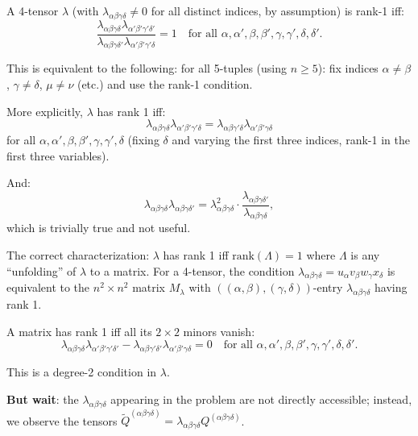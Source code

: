 \documentclass[12pt]{article}
\theoremstyle{definition}
\begin{document}
A 4-tensor $\lambda$ (with $\lambda_{\alpha\beta\gamma\delta}\neq 0$ for all distinct indices, by assumption) is rank-1 iff:
$$\frac{\lambda_{\alpha\beta\gamma\delta}\lambda_{\alpha'\beta'\gamma'\delta'}}{\lambda_{\alpha\beta\gamma\delta'}\lambda_{\alpha'\beta'\gamma'\delta}} = 1 \quad\text{for all }\alpha,\alpha',\beta,\beta',\gamma,\gamma',\delta,\delta'.$$

This is equivalent to the following: for all 5-tuples (using $n\geq 5$): fix indices $\alpha\neq\beta$, $\gamma\neq\delta$, $\mu\neq\nu$ (etc.) and use the rank-1 condition.

More explicitly, $\lambda$ has rank 1 iff:
\begin{equation}\label{eq:rank1-cond}
\lambda_{\alpha\beta\gamma\delta}\lambda_{\alpha'\beta'\gamma'\delta} = \lambda_{\alpha\beta\gamma'\delta}\lambda_{\alpha'\beta'\gamma\delta}
\end{equation}
for all $\alpha,\alpha',\beta,\beta',\gamma,\gamma',\delta$ (fixing $\delta$ and varying the first three indices, rank-1 in the first three variables).

And:
\begin{equation}\label{eq:rank1-cond2}
\lambda_{\alpha\beta\gamma\delta}\lambda_{\alpha\beta\gamma\delta'} = \lambda_{\alpha\beta\gamma\delta}^2 \cdot\frac{\lambda_{\alpha\beta\gamma\delta'}}{\lambda_{\alpha\beta\gamma\delta}},
\end{equation}
which is trivially true and not useful.

The correct characterization: $\lambda$ has rank 1 iff $\mathrm{rank}(\Lambda) = 1$ where $\Lambda$ is any ``unfolding'' of $\lambda$ to a matrix. For a 4-tensor, the condition $\lambda_{\alpha\beta\gamma\delta} = u_\alpha v_\beta w_\gamma x_\delta$ is equivalent to the $n^2\times n^2$ matrix $M_{\lambda}$ with $((\alpha,\beta),(\gamma,\delta))$-entry $\lambda_{\alpha\beta\gamma\delta}$ having rank 1.

A matrix has rank 1 iff all its $2\times 2$ minors vanish:
\begin{equation}\label{eq:rank1-matrix}
\lambda_{\alpha\beta\gamma\delta}\lambda_{\alpha'\beta'\gamma'\delta'} - \lambda_{\alpha\beta\gamma'\delta'}\lambda_{\alpha'\beta'\gamma\delta} = 0 \quad\text{for all }\alpha,\alpha',\beta,\beta',\gamma,\gamma',\delta,\delta'.
\end{equation}

This is a degree-2 condition in $\lambda$.

\textbf{But wait}: the $\lambda_{\alpha\beta\gamma\delta}$ appearing in the problem are not directly accessible; instead, we observe the tensors $\tilde{Q}^{(\alpha\beta\gamma\delta)} = \lambda_{\alpha\beta\gamma\delta}Q^{(\alpha\beta\gamma\delta)}$.
\end{document}
